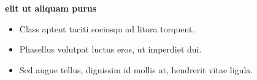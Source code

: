 \documentclass{article}
\begin{document}
	\flushleft
	\textbf{elit ut aliquam purus}
	\begin{itemize}
		\item Class aptent taciti sociosqu ad litora torquent.
		\item Phasellus volutpat luctus eros, ut imperdiet dui.
		\item Sed augue tellus, dignissim id mollis at, hendrerit vitae ligula.
	\end{itemize}
\end{document}
